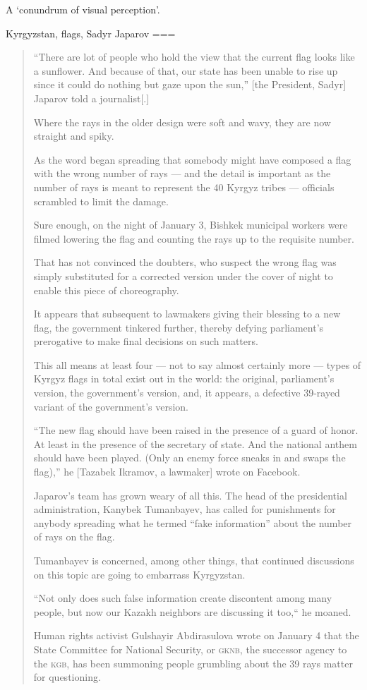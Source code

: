 A ‘conundrum of visual perception’.

Kyrgyzstan, flags, Sadyr Japarov
===
\begin{quote}


    “There are lot of people who hold the view that the current flag looks like a sunflower. And because of that, our state has been unable to rise up since it could do nothing but gaze upon the sun,” [the President, Sadyr] Japarov told a journalist[.]

    Where the rays in the older design were soft and wavy, they are now straight and spiky.

    As the word began spreading that somebody might have composed a flag with the wrong number of rays — and the detail is important as the number of rays is meant to represent the 40 Kyrgyz tribes — officials scrambled to limit the damage.

    Sure enough, on the night of January 3, Bishkek municipal workers were filmed lowering the flag and counting the rays up to the requisite number.

    That has not convinced the doubters, who suspect the wrong flag was simply substituted for a corrected version under the cover of night to enable this piece of choreography.

    It appears that subsequent to lawmakers giving their blessing to a new flag, the government tinkered further, thereby defying parliament’s prerogative to make final decisions on such matters.

    This all means at least four — not to say almost certainly more — types of Kyrgyz flags in total exist out in the world: the original, parliament’s version, the government’s version, and, it appears, a defective 39-rayed variant of the government’s version.

    “The new flag should have been raised in the presence of a guard of honor. At least in the presence of the secretary of state. And the national anthem should have been played. (Only an enemy force sneaks in and swaps the flag),” he [Tazabek Ikramov, a lawmaker] wrote on Facebook.

    Japarov’s team has grown weary of all this. The head of the presidential administration, Kanybek Tumanbayev, has called for punishments for anybody spreading what he termed “fake information” about the number of rays on the flag.

    Tumanbayev is concerned, among other things, that continued discussions on this topic are going to embarrass Kyrgyzstan.

    “Not only does such false information create discontent among many people, but now our Kazakh neighbors are discussing it too,“ he moaned.

    Human rights activist Gulshayir Abdirasulova wrote on January 4 that the State Committee for National Security, or \textsc{gknb}, the successor agency to the \textsc{kgb}, has been summoning people grumbling about the 39 rays matter for questioning.
\end{quote}

\nocite{imanaliyeva2024}